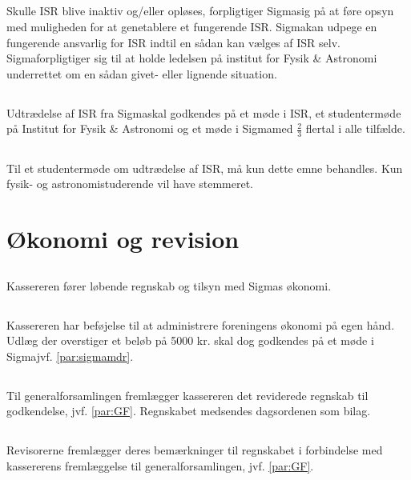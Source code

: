\documentclass[danish,a4paper,twocolumn]{article}
\newcommand{\foreningen}{Sigma}
\begin{document}
\subsection{}Skulle ISR blive inaktiv og/eller opløses, forpligtiger \foreningen sig på at føre opsyn med muligheden for at genetablere et fungerende ISR. \foreningen kan udpege en fungerende ansvarlig for ISR indtil en sådan kan vælges af ISR selv. \foreningen forpligtiger sig til at holde ledelsen på institut for Fysik \& Astronomi underrettet om en sådan givet- eller lignende situation.
\subsection{}Udtrædelse af ISR fra \foreningen skal godkendes på et møde i ISR, et studentermøde på Institut for  Fysik \& Astronomi og et møde i \foreningen med $\frac{2}{3}$ flertal i alle tilfælde.
\subsection{}Til et studentermøde om udtrædelse af ISR, må kun dette emne behandles. Kun fysik- og astronomistuderende vil have stemmeret.

\section{Økonomi og revision}
\subsection{}Kassereren fører løbende regnskab og tilsyn med \foreningen s økonomi.
\subsection{}Kassereren har beføjelse til at administrere foreningens økonomi på egen hånd. Udlæg der overstiger et beløb på 5000 kr. skal dog godkendes på et møde i \foreningen jvf. \ref{par:sigmamdr}.
\subsection{}Til generalforsamlingen fremlægger kassereren det reviderede regnskab til godkendelse, jvf. \ref{par:GF}. Regnskabet medsendes dagsordenen som bilag.
\subsection{}Revisorerne fremlægger deres bemærkninger til regnskabet i forbindelse med kassererens fremlæggelse til generalforsamlingen, jvf. \ref{par:GF}.
\end{document}
